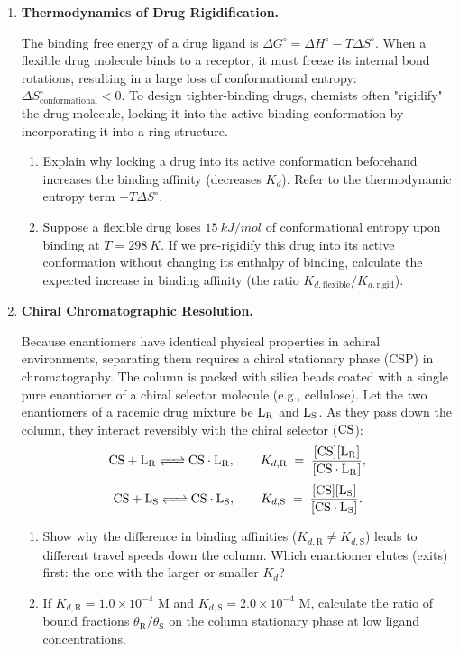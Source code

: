 \documentclass[12pt, a4paper]{book}
\begin{document}
\begin{deepbox}
\begin{enumerate}[label=\textbf{D\arabic*.}]
  \item \textbf{Thermodynamics of Drug Rigidification.}
  
        The binding free energy of a drug ligand is $\Delta G^\circ = \Delta H^\circ - T \Delta S^\circ$.
        When a flexible drug molecule binds to a receptor, it must freeze its internal bond rotations, resulting in a large loss of conformational entropy: $\Delta S^\circ_{\text{conformational}} < 0$.
        To design tighter-binding drugs, chemists often "rigidify" the drug molecule, locking it into the active binding conformation by incorporating it into a ring structure.
        \begin{enumerate}[label=(\alph*)]
          \item Explain why locking a drug into its active conformation beforehand increases the binding affinity (decreases $K_d$). Refer to the thermodynamic entropy term $-T\Delta S^\circ$.
          \item Suppose a flexible drug loses $\SI{15}{kJ/mol}$ of conformational entropy upon binding at $T = \SI{298}{K}$.
                If we pre-rigidify this drug into its active conformation without changing its enthalpy of binding, calculate the expected increase in binding affinity (the ratio $K_{d,\text{flexible}}/K_{d,\text{rigid}}$).
        \end{enumerate}

  \item \textbf{Chiral Chromatographic Resolution.}
  
        Because enantiomers have identical physical properties in achiral environments, separating them requires a chiral stationary phase (CSP) in chromatography.
        The column is packed with silica beads coated with a single pure enantiomer of a chiral selector molecule (e.g., cellulose).
        Let the two enantiomers of a racemic drug mixture be $\ce{L_R}$ and $\ce{L_S}$. As they pass down the column, they interact reversibly with the chiral selector ($\ce{CS}$):
        \[
          \ce{CS + L_R <=> CS\cdot L_R}, \qquad K_{d,\text{R}} \;=\; \frac{[\ce{CS}][\ce{L_R}]}{[\ce{CS\cdot L_R}]},
        \]
        \[
          \ce{CS + L_S <=> CS\cdot L_S}, \qquad K_{d,\text{S}} \;=\; \frac{[\ce{CS}][\ce{L_S}]}{[\ce{CS\cdot L_S}]}.
        \]
        \begin{enumerate}[label=(\alph*)]
          \item Show why the difference in binding affinities ($K_{d,\text{R}} \neq K_{d,\text{S}}$) leads to different travel speeds down the column. Which enantiomer elutes (exits) first: the one with the larger or smaller $K_d$?
          \item If $K_{d,\text{R}} = 1.0 \times 10^{-4}$ M and $K_{d,\text{S}} = 2.0 \times 10^{-4}$ M, calculate the ratio of bound fractions $\theta_{\text{R}}/\theta_{\text{S}}$ on the column stationary phase at low ligand concentrations.
        \end{enumerate}
\end{enumerate}
\end{deepbox}
\end{document}
